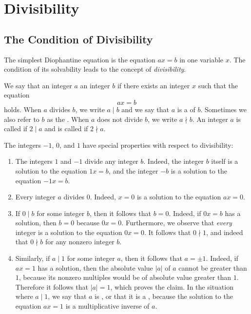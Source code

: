 \chapter{Divisibility}
\label{chapter:divisibility}

\section{The Condition of Divisibility}

The simplest Diophantine equation is the equation $ax=b$ in one variable $x$. The condition of its solvability leads to the concept of \emph{divisibility}.

\begin{definition}
  We say that an integer $a$  an integer $b$ if there exists an integer $x$ such that the equation
  \begin{equation*}
    ax=b
  \end{equation*}
  holds. When $a$ divides $b$, we write $a\mid b$ and we say that $a$ is a  of $b$. Sometimes we also refer to $b$ as the . When $a$ does not divide $b$, we write $a\nmid b$. An integer $a$ is called  if $2\mid a$ and is called  if $2\nmid a$.
\end{definition}

\begin{example}
  The integers $-1$, $0$, and $1$ have special properties with respect to divisibility:
  \begin{enumerate}
  \item The integers $1$ and $-1$ divide any integer $b$. Indeed, the integer $b$ itself is a solution to the equation $1x=b$, and the integer $-b$ is a solution to the equation $-1x=b$.
  \item Every integer $a$ divides $0$. Indeed, $x=0$ is a solution to the equation $ax=0$.
  \item If $0\mid b$ for some integer $b$, then it follows that $b=0$. Indeed, if $0x=b$ has a solution, then $b=0$ because $0x=0$. Furthermore, we observe that \emph{every} integer is a solution to the equation $0x=0$. It follows that $0\nmid 1$, and indeed that $0\nmid b$ for any nonzero integer $b$.
  \item Similarly, if $a\mid 1$ for some integer $a$, then it follows that $a=\pm 1$. Indeed, if $ax=1$ has a solution, then the absolute value $|a|$ of $a$ cannot be greater than $1$, because its nonzero multiples would be of absolute value greater than $1$. Therefore it follows that $|a|=1$, which proves the claim. In the situation where $a\mid 1$, we say that $a$ is , or that it is a , because the solution to the equation $ax=1$ is a multiplicative inverse of $a$.
  \end{enumerate}
\end{example}

